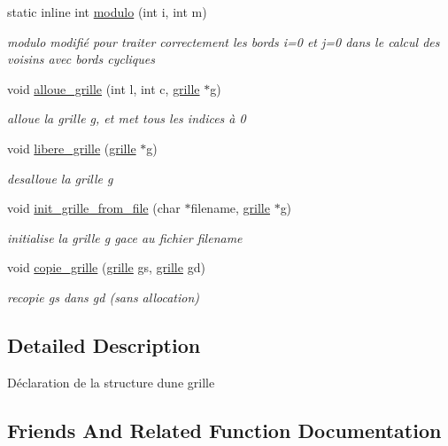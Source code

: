 \begin{DoxyCompactItemize}
static inline int \hyperlink{structgrille_a8cc2b5e88ad337fae1efad3f36d33f01}{modulo} (int i, int m)
\begin{DoxyCompactList}\small\item\em modulo modifié pour traiter correctement les bords i=0 et j=0 dans le calcul des voisins avec bords cycliques \end{DoxyCompactList}\item 
void \hyperlink{structgrille_ae621f51c60aa4fafaa0c9f6c9b5a4036}{alloue\+\_\+grille} (int l, int c, \hyperlink{structgrille}{grille} $\ast$g)
\begin{DoxyCompactList}\small\item\em alloue la grille g, et met tous les indices à 0 \end{DoxyCompactList}\item 
void \hyperlink{structgrille_a7074b2b15576e9d2b3cd15c3a1dc7012}{libere\+\_\+grille} (\hyperlink{structgrille}{grille} $\ast$g)
\begin{DoxyCompactList}\small\item\em desalloue la grille g \end{DoxyCompactList}\item 
void \hyperlink{structgrille_adf5501cc0bbad28f5ffc561d92197e4e}{init\+\_\+grille\+\_\+from\+\_\+file} (char $\ast$filename, \hyperlink{structgrille}{grille} $\ast$g)
\begin{DoxyCompactList}\small\item\em initialise la grille g gace au fichier filename \end{DoxyCompactList}\item 
void \hyperlink{structgrille_a63b3ae16c86b568f6aa8f9ce84128b1e}{copie\+\_\+grille} (\hyperlink{structgrille}{grille} gs, \hyperlink{structgrille}{grille} gd)
\begin{DoxyCompactList}\small\item\em recopie gs dans gd (sans allocation) \end{DoxyCompactList}\end{DoxyCompactItemize}


\subsection{Detailed Description}
Déclaration de la structure d\textquotesingle{}une grille 

\subsection{Friends And Related Function Documentation}
